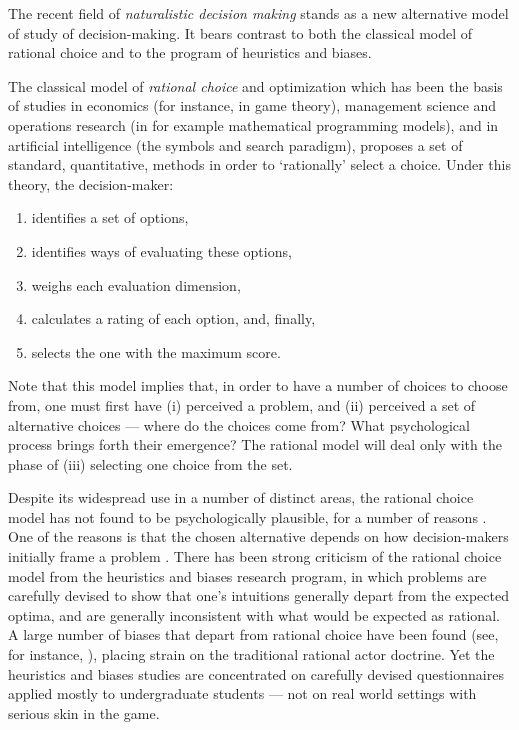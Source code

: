 The recent field of \emph{naturalistic decision making} stands as a new alternative model of study of decision-making.  It bears contrast to both the classical model of rational choice and to the program of heuristics and biases.

The classical model of \emph{rational choice} and optimization which has been the basis of studies in economics (for instance, in game theory), management science and operations research (in for example mathematical programming models), and in artificial intelligence (the symbols and search paradigm), proposes a set of standard, quantitative, methods in order to `rationally' select a choice.  Under this theory, the decision-maker:

\begin{enumerate}
	\item identifies a set of options,
	\item identifies ways of evaluating these options,
	\item weighs each evaluation dimension,
	\item calculates a rating of each option, and, finally,
	\item selects the one with the maximum score.
\end{enumerate}

Note that this model implies that, in order to have a number of choices to choose from, one must first have (i) perceived a problem, and (ii) perceived a set of alternative choices --- where do the choices come from?  What psychological process brings forth their emergence?  The rational model will deal only with the phase of (iii) selecting one choice from the set.

Despite its widespread use in a number of distinct areas, the rational choice model has not found to be psychologically plausible, for a number of reasons \citep{plous_psychology_1993}.  One of the reasons is that the chosen alternative depends on how decision-makers initially frame a problem \citep{kahneman1979prospect}. There has been strong criticism of the rational choice model from the heuristics and biases research program, in which problems are carefully devised to show that one's intuitions generally depart from the expected optima, and are generally inconsistent with what would be expected as rational.  A large number of biases that depart from rational choice have been found (see, for instance, \citet{plous_psychology_1993}), placing strain on the traditional rational actor doctrine.  Yet the heuristics and biases studies are concentrated on carefully devised questionnaires applied mostly to undergraduate students --- not on real world settings with serious skin in the game.


